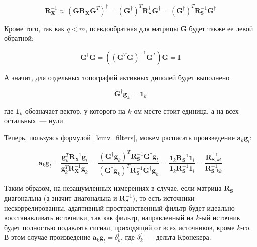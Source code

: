 \begin{equation}
    \mathbf{R}_\mathbf{X}^{-1} \approx {(\mathbf{G} \mathbf{R}_\mathbf{X} \mathbf{G}^T)}^\dagger =
    {(\mathbf{G}^\dagger)}^T \mathbf{R}_\mathbf{S}^\dagger \mathbf{G}^\dagger = 
    {(\mathbf{G}^\dagger)}^T \mathbf{R}_\mathbf{S}^{-1} \mathbf{G}^\dagger
\end{equation}

Кроме того, так как $q < m$, псевдообратная для матрицы $\mathbf{G}$ будет также ее левой обратной:

\begin{equation}
    \mathbf{G}^\dagger \mathbf{G} = ({(\mathbf{G}^T \mathbf{G})}^{-1} \mathbf{G}^T) \mathbf{G} = \mathbf{I}
\end{equation}

А значит, для отдельных топографий активных диполей будет выполнено

\begin{equation}
    \mathbf{G}^\dagger \mathbf{g}_k = \mathbf{1}_k
\end{equation}

где $\mathbf{1}_k$ обозначает вектор, у которого на $k$-ом месте стоит единица,
а на всех остальных~--- нули.

Теперь, пользуясь формулой~\ref{lcmv_filters}, можем расписать произведение
$\mathbf{a}_k \mathbf{g}_l$:

\begin{equation}
    \mathbf{a}_k \mathbf{g}_l = \frac{\mathbf{g}_k^T \mathbf{R}_\mathbf{X}^{-1}\mathbf{g}_l}
                                   {\mathbf{g}_k^T \mathbf{R}_\mathbf{X}^{-1} \mathbf{g}_k}=
  \frac{{(\mathbf{G}^\dagger\mathbf{g}_k)}^T \mathbf{R}_\mathbf{S}^{-1} \mathbf{G}^\dagger \mathbf{g}_l}
       {{(\mathbf{G}^\dagger\mathbf{g}_k)}^T \mathbf{R}_\mathbf{S}^{-1} \mathbf{G}^\dagger \mathbf{g}_k}=
       \frac{\mathbf{1}_k \mathbf{R}_\mathbf{S}^{-1} \mathbf{1}_l}
            {\mathbf{1}_k \mathbf{R}_\mathbf{S}^{-1} \mathbf{1}_l} =
            \frac{\mathbf{R}_{\mathbf{S}, kl}^{-1}}
                 {\mathbf{R}_{\mathbf{S}, kk}^{-1}}
\end{equation}

Таким образом, на незашумленных измерениях в случае, если матрица $\mathbf{R}_\mathbf{S}$ диагональна
(а значит диагональна и $\mathbf{R}_\mathbf{S}^{-1}$),
то есть источники нескоррелированны, адаптивный пространственный фильтр
будет идеально восстанавливать источники, так как фильтр, направленный на $k$-ый источник
будет полностью подавлять сигнал, приходящий от всех источников, кроме $k$-го.
В этом случае произведение $\mathbf{a}_k \mathbf{g}_l = \delta_k^l$, где $\delta_k^l$~--- дельта Кронекера.

